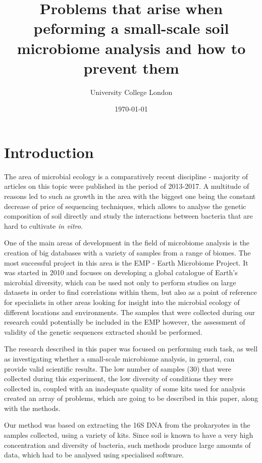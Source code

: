 \documentclass[12pt,twocolumn]{article} %
\title{Problems that arise when peforming a small-scale soil microbiome analysis and how to prevent them}
\author{\normalsize University College London \\}
\date{\today}
\begin{document}
	
\maketitle
%
%

\section{Introduction}
The area of microbial ecology is a comparatively recent discipline -  majority of articles on this topic were published in the period of 2013-2017. A multitude of reasons led to such as growth in the area with the biggest one being the constant decrease of price of sequencing techniques, which allows to analyse the genetic composition of soil directly and study the interactions between bacteria that are hard to cultivate \textit{in vitro}.
\par
One of the main areas of development in the field of microbiome analysis is the creation of big databases with a variety of samples from a range of biomes. The most successful project in this area is the EMP - Earth Microbiome Project\cite{Gilbert2014}. It was started in 2010 and focuses on developing a global catalogue of Earth's microbial diversity, which can be used not only to perform studies on large datasets in order to find correlations within them, but also as a point of reference for specialists in other areas looking for insight into the microbial ecology of different locations and environments. The samples that were collected during our research could potentially be included in the EMP however, the assessment of validity of the genetic sequences extracted should be performed.
\par
The research described in this paper was focused on performing such task, as well as investigating whether a small-scale microbiome analysis, in general, can provide valid scientific results. The low number of samples (30) that were collected during this experiment, the low diversity of conditions they were collected in, coupled with an inadequate quality of some kits used for analysis created an array of problems, which are going to be described in this paper, along with the methods.
\par
Our method was based on extracting the 16S DNA from the prokaryotes in the samples collected, using a variety of kits. Since soil is known to have a very high concentration and diversity of bacteria\cite{Nannipieri2003,Torsvik1996}, such methods produce large amounts of data, which had to be analysed using specialised software.
%
\end{document}
